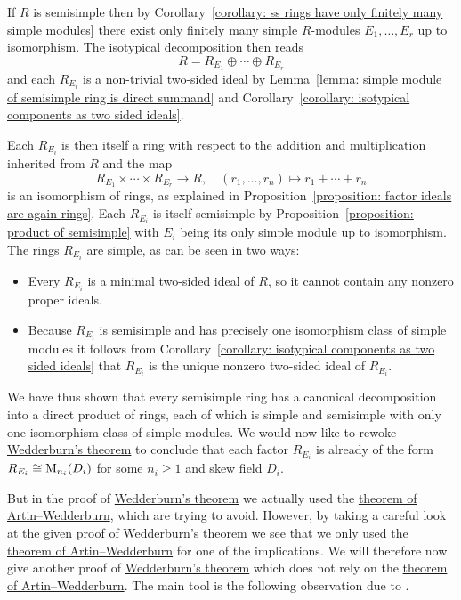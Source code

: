 \begin{fluff}
  \label{fluff: intro to artin wedderburn}
  If $R$ is semisimple then by Corollary~\ref{corollary: ss rings have only finitely many simple modules} there exist only finitely many simple $R$-modules $E_1, \dotsc, E_r$ up to isomorphism.
  The \hyperref[theorem: isotypical decomposition]{isotypical decomposition} then reads
  \[
      R
    = R_{E_1} \oplus \dotsb \oplus R_{E_r}
  \]
  and each $R_{E_i}$ is a non-trivial two-sided ideal by Lemma~\ref{lemma: simple module of semisimple ring is direct summand} and Corollary~\ref{corollary: isotypical components as two sided ideals}.
  
  Each $R_{E_i}$ is then itself a ring with respect to the addition and multiplication inherited from $R$ and the map
  \[
            R_{E_1} \times \dotsb \times R_{E_r}
    \to     R,
    \quad   (r_1, \dotsc, r_n)
    \mapsto r_1 + \dotsb + r_n
  \]
  is an isomorphism of rings, as explained in Proposition~\ref{proposition: factor ideals are again rings}.
  Each $R_{E_i}$ is itself semisimple by Proposition~\ref{proposition: product of semisimple} with $E_i$ being its only simple module up to isomorphism.
  The rings $R_{E_i}$ are simple, as can be seen in two ways:
  \begin{itemize}
    \item
      Every $R_{E_i}$ is a minimal two-sided ideal of $R$, so it cannot contain any nonzero proper ideals.
    \item
      Because $R_{E_i}$ is semisimple and has precisely one isomorphism class of simple modules it follows from Corollary~\ref{corollary: isotypical components as two sided ideals} that $R_{E_i}$ is the unique nonzero two-sided ideal of $R_{E_i}$.
  \end{itemize}
  
  We have thus shown that every semisimple ring has a canonical decomposition into a direct product of rings, each of which is simple and semisimple with only one isomorphism class of simple modules.
  We would now like to rewoke \hyperref[theorem: wedderburns theorem]{Wedderburn’s theorem} to conclude that each factor $R_{E_i}$ is already of the form $R_{E_i} \cong \operatorname{M}_{n_i}(D_i)$ for some $n_i \geq 1$ and skew field $D_i$.
  
  But in the proof of \hyperref[theorem: wedderburns theorem]{Wedderburn’s theorem} we actually used the \hyperref[theorem: artin wedderburn theorem]{theorem of Artin--Wedderburn}, which are trying to avoid.
  However, by taking a careful look at the \hyperref[proof: wedderburns theorem first proof]{given proof} of \hyperref[theorem: wedderburns theorem]{Wedderburn’s theorem} we see that we only used the \hyperref[theorem: artin wedderburn theorem]{theorem of Artin--Wedderburn} for one of the implications.
  We will therefore now give another proof of \hyperref[theorem: wedderburns theorem]{Wedderburn’s theorem} which does not rely on the \hyperref[theorem: artin wedderburn theorem]{theorem of Artin--Wedderburn}.
  The main tool is the following observation due to \cite{Rieffel}.
\end{fluff}


